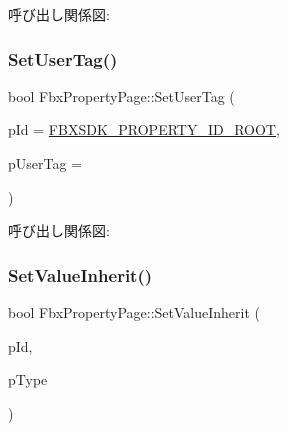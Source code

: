 呼び出し関係図\+:
\mbox{\label{class_fbx_property_page_aa0283d7109116caafaac33e20013835e}} 
\subsubsection{\texorpdfstring{Set\+User\+Tag()}{SetUserTag()}}
{\footnotesize\ttfamily bool Fbx\+Property\+Page\+::\+Set\+User\+Tag (\begin{DoxyParamCaption}\item[{\hyperlink{fbxtypes_8h_a088fa96de3b0b3ea69f0f6afef525dfb}{Fbx\+Int}}]{p\+Id = {\ttfamily \hyperlink{fbxpropertydef_8h_a291bdb6d8428dce8463143fa3aba2c34}{F\+B\+X\+S\+D\+K\+\_\+\+P\+R\+O\+P\+E\+R\+T\+Y\+\_\+\+I\+D\+\_\+\+R\+O\+OT}},  }\item[{int}]{p\+User\+Tag = {} }\end{DoxyParamCaption})}

呼び出し関係図\+:
\mbox{\label{class_fbx_property_page_a65b19fb72a27bd344e2ede296a3b1593}} 
\subsubsection{\texorpdfstring{Set\+Value\+Inherit()}{SetValueInherit()}}
{\footnotesize\ttfamily bool Fbx\+Property\+Page\+::\+Set\+Value\+Inherit (\begin{DoxyParamCaption}\item[{\hyperlink{fbxtypes_8h_a088fa96de3b0b3ea69f0f6afef525dfb}{Fbx\+Int}}]{p\+Id,  }\item[{\hyperlink{class_fbx_property_flags_ae3b667a4fcac4b827fa186a698fec2f8}{Fbx\+Property\+Flags\+::\+E\+Inherit\+Type}}]{p\+Type }\end{DoxyParamCaption})}

\mbox{\label{class_fbx_property_page_a21b12eedb243bcf7b0d587c476b4c472}} 
